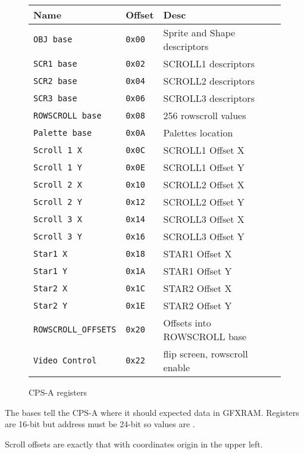  \begin{figure}[H]
\begin{tabularx}{\textwidth}{llX}
  \toprule    
  \textbf{Name } & \textbf{ Offset }  & \textbf{Desc }  \\     
  \toprule   
  \texttt{OBJ base}  &  \texttt{0x00} & Sprite and Shape descriptors   \\   
\texttt{SCR1 base} &  \texttt{0x02}  & SCROLL1 descriptors   \\         
\texttt{SCR2 base} &  \texttt{0x04}  & SCROLL2 descriptors   \\     
\texttt{SCR3 base}&  \texttt{0x06}   & SCROLL3 descriptors  \\     
\texttt{ROWSCROLL base} &  \texttt{0x08}  & 256 rowscroll values   \\     
\texttt{Palette base} &  \texttt{0x0A}  & Palettes location   \\   
\texttt{Scroll 1 X} &  \texttt{0x0C}  & SCROLL1 Offset X  \\ 
\texttt{Scroll 1 Y} &  \texttt{0x0E}  & SCROLL1 Offset Y    \\   
\texttt{Scroll 2 X} &  \texttt{0x10}  & SCROLL2 Offset X    \\ 
\texttt{Scroll 2 Y} &  \texttt{0x12}  & SCROLL2 Offset Y    \\   
\texttt{Scroll 3 X} &  \texttt{0x14}  & SCROLL3 Offset X    \\ 
\texttt{Scroll 3 Y} &  \texttt{0x16}  & SCROLL3 Offset Y    \\     
\texttt{Star1    X} &  \texttt{0x18}  & STAR1   Offset X    \\  
\texttt{Star1    Y} &  \texttt{0x1A}  & STAR1   Offset Y    \\  
\texttt{Star2    X} &  \texttt{0x1C}  & STAR2   Offset X    \\  
\texttt{Star2    Y} &  \texttt{0x1E}  & STAR2   Offset Y    \\  
\texttt{ROWSCROLL\_OFFSETS} &  \texttt{0x20}  & Offsets into ROWSCROLL base\\
\texttt{Video Control} &  \texttt{0x22}  & flip screen, rowscroll enable\\
  \toprule   
\end{tabularx}
\caption*{CPS-A registers}
\end{figure}

The bases tell the CPS-A where it should expected data in GFXRAM. Registers are 16-bit but address must be 24-bit so values are . 

Scroll offsets are exactly that with coordinates origin in the upper left.

